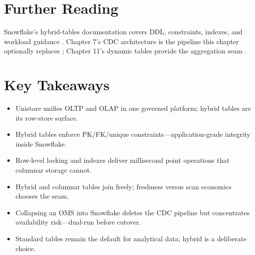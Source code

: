 \section{Further Reading}
Snowflake's hybrid-tables documentation covers DDL, constraints, indexes, and workload guidance \cite{snowflakeHybridTablesDocs}. Chapter 7's CDC architecture is the pipeline this chapter optionally replaces \cite{snowflakeStreamsDocs}; Chapter 11's dynamic tables provide the aggregation seam \cite{snowflakeDynamicTablesDocs}.

\section*{Key Takeaways}
\begin{itemize}
    \item Unistore unifies OLTP and OLAP in one governed platform; hybrid tables are its row-store surface.
    \item Hybrid tables enforce PK/FK/unique constraints---application-grade integrity inside Snowflake.
    \item Row-level locking and indexes deliver millisecond point operations that columnar storage cannot.
    \item Hybrid and columnar tables join freely; freshness versus scan economics chooses the seam.
    \item Collapsing an OMS into Snowflake deletes the CDC pipeline but concentrates availability risk---dual-run before cutover.
    \item Standard tables remain the default for analytical data; hybrid is a deliberate choice.
\end{itemize}

